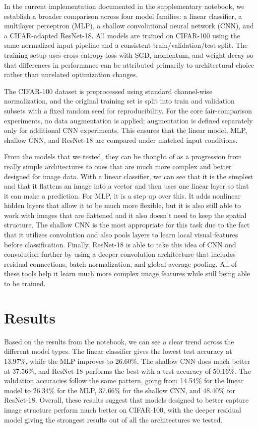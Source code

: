 \documentclass{article}
\begin{document}
In the current implementation documented in the supplementary notebook, we establish a broader comparison across four model families: a linear classifier, a multilayer perceptron (MLP), a shallow convolutional neural network (CNN), and a CIFAR-adapted ResNet-18. All models are trained on CIFAR-100 using the same normalized input pipeline and a consistent train/validation/test split. The training setup uses cross-entropy loss with SGD, momentum, and weight decay so that differences in performance can be attributed primarily to architectural choice rather than unrelated optimization changes.

The CIFAR-100 dataset is preprocessed using standard channel-wise normalization, and the original training set is split into train and validation subsets with a fixed random seed for reproducibility. For the core fair-comparison experiments, no data augmentation is applied; augmentation is defined separately only for additional CNN experiments. This ensures that the linear model, MLP, shallow CNN, and ResNet-18 are compared under matched input conditions.

From the models that we tested, they can be thought of as a progression from really simple architectures to ones that are much more complex and better designed for image data. With a linear classifier, we can see that it is the simplest and that it flattens an image into a vector and then uses one linear layer so that it can make a prediction. For MLP, it is a step up over this. It adds nonlinear hidden layers that allow it to be much more flexible, but it is also still able to work with images that are flattened and it also doesn’t need to keep the spatial structure. The shallow CNN is the most appropriate for this task due to the fact that it utilizes convolution and also pools layers to learn local visual features before classification. Finally, ResNet-18 is able to take this idea of CNN and convolution further by using a deeper convolution architecture that includes residual connections, batch normalization, and global average pooling. All of these tools help it learn much more complex image features while still being able to be trained.

\section{Results}

Based on the results from the notebook, we can see a clear trend across the different model types. The linear classifier gives the lowest test accuracy at 13.97\%, while the MLP improves to 26.60\%. The shallow CNN does much better at 37.56\%, and ResNet-18 performs the best with a test accuracy of 50.16\%. The validation accuracies follow the same pattern, going from 14.54\% for the linear model to 26.34\% for the MLP, 37.66\% for the shallow CNN, and 48.40\% for ResNet-18. Overall, these results suggest that models designed to better capture image structure perform much better on CIFAR-100, with the deeper residual model giving the strongest results out of all the architectures we tested.
\end{document}
